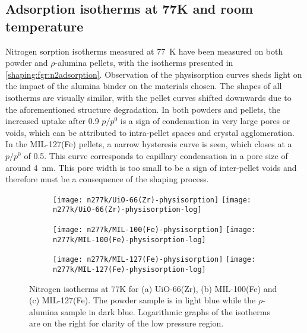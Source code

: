 
\subsection{Adsorption isotherms at 77K and room temperature}

Nitrogen sorption isotherms measured at \SI{77}{\kelvin} have been
measured on both powder and \(\rho\)-alumina pellets, with the isotherms
presented in \autoref{shaping:fgr:n2adsorption}.
Observation of the physisorption curves sheds light on the
impact of the alumina binder on the materials chosen.
The shapes of all isotherms are visually similar, with the pellet curves
shifted downwards due to the aforementioned structure degradation.
In both powders and pellets, the increased uptake after 0.9 \(p/p^0\)
is a sign of condensation in very large pores or voids, which can
be attributed to intra-pellet spaces and crystal agglomeration.
In the MIL-127(Fe) pellets, a narrow hysteresis curve is seen,
which closes at a \(p/p^0\) of 0.5. This curve corresponds to
capillary condensation in a pore size of around \SI{4}{\nano\metre}.
This pore width is too small to be a sign of
inter-pellet voids and therefore must be a consequence of the shaping
process.

\begin{figure}[p!]
	\centering

	\begin{subfigure}{\linewidth}
		\centering
		\parbox[c]{0.1\linewidth}{\caption{}\label{shaping:fgr:n277kuio66}}%
		\texttt{[image: n277k/UiO-66(Zr)-physisorption]}%
		\texttt{[image: n277k/UiO-66(Zr)-physisorption-log]}%
	\end{subfigure}

	\begin{subfigure}{\linewidth}
		\centering
		\parbox[c]{0.1\linewidth}{\caption{}\label{shaping:fgr:n277kuio66}}%
		\texttt{[image: n277k/MIL-100(Fe)-physisorption]}%
		\texttt{[image: n277k/MIL-100(Fe)-physisorption-log]}%
	\end{subfigure}

	\begin{subfigure}{\linewidth}
		\centering
		\parbox[c]{0.1\linewidth}{\caption{}\label{shaping:fgr:n277kmil127}}%
		\texttt{[image: n277k/MIL-127(Fe)-physisorption]}%
		\texttt{[image: n277k/MIL-127(Fe)-physisorption-log]}%
		\label{shaping:fgr:n277kmil127}
	\end{subfigure}

	\caption{Nitrogen isotherms at 77K for (a) UiO-66(Zr),
		(b) MIL-100(Fe) and (c) MIL-127(Fe). The powder sample is in light
		blue while the \(\rho\)-alumina sample in dark blue. Logarithmic
		graphs of the isotherms are on the right for clarity of the low
		pressure region.}%
	\label{shaping:fgr:n2adsorption}
\end{figure}

